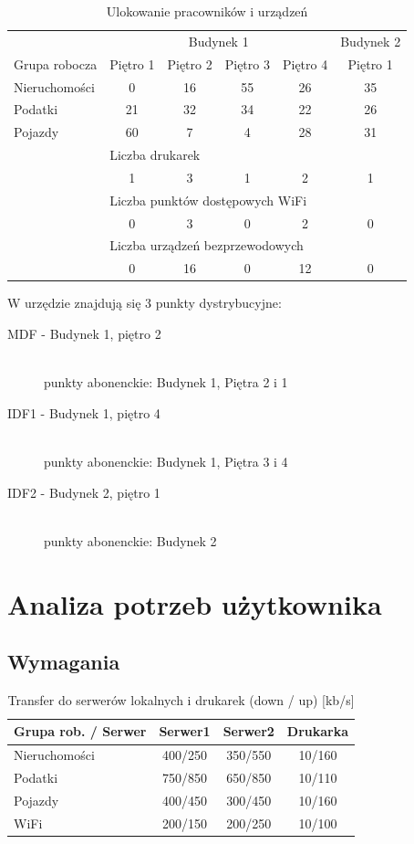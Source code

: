 \documentclass[12pt,a4paper]{article}
\begin{document}
	\begin{table}[H]
		\centering
		\begin{tabular}{l|c|c|c|c|c}
			&\multicolumn{4}{c|}{Budynek 1}&Budynek 2\\
			Grupa robocza&Piętro 1&Piętro 2&Piętro 3&Piętro 4&Piętro 1\\\hline
			Nieruchomości&0&16&55&26&35\\
			Podatki&21&32&34&22&26\\
			Pojazdy&60&7&4&28&31\\\hline
			&\multicolumn{5}{l}{Liczba drukarek}\\			
			&1&3&1&2&1\\\hline
			&\multicolumn{5}{l}{Liczba punktów dostępowych WiFi}\\				
			&0&3&0&2&0\\\hline
			&\multicolumn{5}{l}{Liczba urządzeń bezprzewodowych}\\				
			&0&16&0&12&0\\
		\end{tabular}
		\caption{Ulokowanie pracowników i urządzeń}
	\end{table}

	\noindent
	W urzędzie znajdują się 3 punkty dystrybucyjne:
	\begin{description}
		\item[MDF - Budynek 1, piętro 2] \hfill \\ punkty abonenckie: Budynek 1, Piętra 2 i 1
		\item[IDF1 - Budynek 1, piętro 4] \hfill \\ punkty abonenckie: Budynek 1, Piętra 3 i 4
		\item[IDF2 - Budynek 2, piętro 1] \hfill \\ punkty abonenckie: Budynek 2
	\end{description}

	\section{Analiza potrzeb użytkownika}
	
	\subsection{Wymagania}
	
	\begin{table}[H]
		\centering
		\begin{tabular}{l|c|c|c}
			Grupa rob. / Serwer&Serwer1&Serwer2&Drukarka\\\hline
			Nieruchomości&400/250&350/550&10/160\\
			Podatki&750/850&650/850&10/110\\
			Pojazdy&400/450&300/450&10/160\\
			WiFi&200/150&200/250&10/100\\
		\end{tabular}
		\caption{Transfer do serwerów lokalnych i drukarek (down / up) [kb/s]}
	\end{table}
\end{document}
